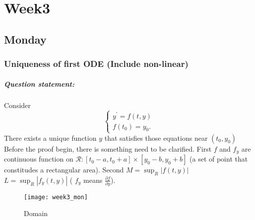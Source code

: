 

\chapter{Week3}

\section{Monday}
\subsection{Uniqueness of first ODE (Include non-linear)}
\paragraph{Question statement:}
Consider \[\left \{	\begin{gathered}
y^\prime=f(t,y)	\\
f(t_0)=y_0.
\end{gathered}\right.\] There exists a unique function $y$ that satisfies those equations near $(t_0,y_0)$\\
Before the proof begin, there is something need to be clarified. First $f$ and $f_y$ are continuous function on $\mathcal{R}:[t_0-a,t_0+a]\times[y_0-b,y_0+b]$ (a set of point that constitudes a rectangular area). Second $M=\sup_R|f(t,y)|$ $L=\sup_R|f_y(t,y)|$ ( $f_y$ means $\frac{\partial f}{\partial y}$).
\begin{figure}[H]
\centering
\texttt{[image: week3\_mon]}
\caption{Domain}
\end{figure}

